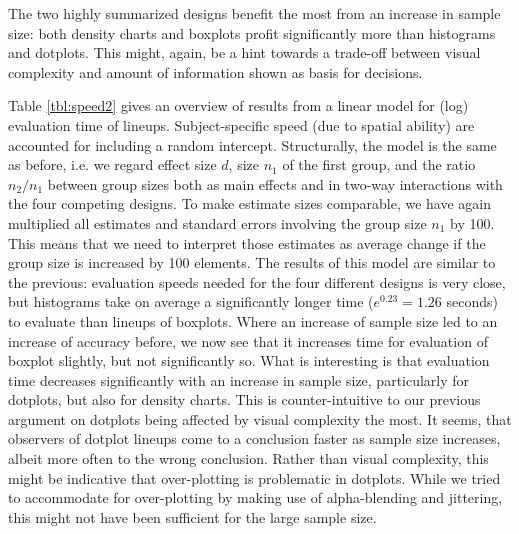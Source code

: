 The two highly summarized designs benefit the most from an increase in sample size: both density charts and boxplots profit significantly more than histograms and dotplots. This might, again, be a hint towards a trade-off between visual complexity and amount of information shown as basis for decisions. 


Table \ref{tbl:speed2} gives an overview of results from a linear model for (log) evaluation time of lineups. Subject-specific speed (due to spatial ability) are accounted for  including a random intercept. Structurally, the model is the same as before, i.e. we regard effect size $d$, size $n_1$ of the first group, and the ratio $n_2/n_1$ between group sizes both as main effects and in two-way interactions with the four competing designs. To make estimate sizes comparable, we have again multiplied all estimates and standard errors involving the group size $n_1$ by 100. This means that we need to interpret those  estimates as average change if the group size is increased by 100 elements. 
The results of this model are similar to the previous: evaluation speeds needed for the four different designs is very close, but  histograms take on average a significantly longer time ($e^{0.23} = 1.26$ seconds) to evaluate than lineups of boxplots. 
Where an increase of sample size led to an increase of accuracy before, we now see that it increases time for evaluation of boxplot slightly, but not significantly so. What is interesting is that evaluation time decreases significantly with an increase in sample size, particularly for dotplots, but also for density charts. This is counter-intuitive to our previous argument on dotplots being affected by visual complexity the most. It seems, that observers of dotplot lineups come to a conclusion faster as sample size increases, albeit more often to  the wrong conclusion. Rather than visual complexity, this might be indicative that over-plotting is problematic in dotplots. While we tried to accommodate for over-plotting by making use of alpha-blending and jittering, this might not have been sufficient for the large sample size.
 
